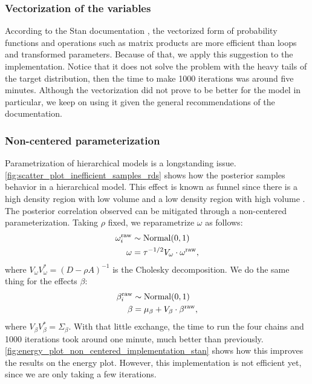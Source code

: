 \subsubsection*{Vectorization of the variables}

According to the Stan documentation \cite{stan2021vectorization}, the
vectorized form of probability functions and operations such as matrix
products are more efficient than loops and transformed parameters. Because of
that, we apply this suggestion to the implementation. Notice that it does not
solve the problem with the heavy tails of the target distribution, then the
time to make 1000 iterations was around five minutes. Although the vectorization did
not prove to be better for the model in particular, we keep on using it given
the general recommendations of the documentation.

\subsubsection*{Non-centered parameterization}

Parametrization of hierarchical models is a longstanding issue.
\autoref{fig:scatter_plot_inefficient_samples_rds} shows how the posterior
samples behavior in a hierarchical model. This effect is known as funnel since
there is a high density region with low volume and a low density region with
high volume \cite[p. 1]{betancourt2015hamiltonian}. The posterior correlation
observed can be mitigated through a non-centered parameterization. Taking
$\rho$ fixed, we reparametrize $\omega$ as follows:
\begin{equation*}
  \begin{split}
    \omega^{\mathrm{raw}}_i &\sim \operatorname{Normal}(0,1) \\
    \omega &= \tau^{-1/2}V_{\omega} \cdot \omega^{\mathrm{raw}},
  \end{split}
\end{equation*}
where $V_{\omega}V_{\omega}^{*} = (D - \rho A)^{-1}$ is the Cholesky decomposition. We do the
same thing for the effects $\beta$:
\begin{equation*}
  \begin{split}
    \beta^{\mathrm{raw}}_i &\sim \operatorname{Normal}(0,1) \\
    \beta &= \mu_{\beta} + V_{\beta} \cdot \beta^{\mathrm{raw}},
  \end{split}
\end{equation*}
where $V_{\beta}V_{\beta}^{*} = \Sigma_{\beta}$. With that little exchange,
the time to run the four chains and 1000 iterations took around one minute, much
better than previously.
\autoref{fig:energy_plot_non_centered_implementation_stan} shows how this
improves the results on the energy plot. However, this implementation is not
efficient yet, since we are only taking a few iterations.

